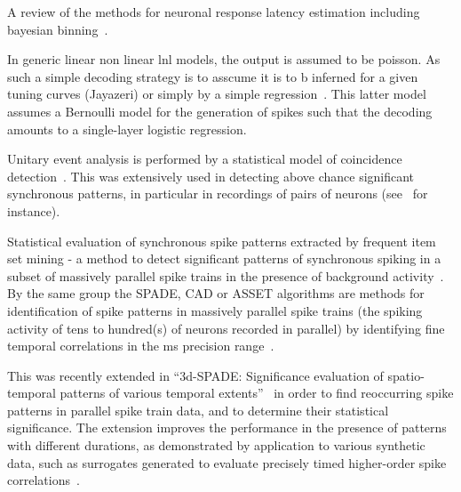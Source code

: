 \documentclass[brainsci, %
               review,submit,pdftex,moreauthors]{Definitions/mdpi}
\begin{document}
A review of the methods for neuronal response latency estimation including bayesian binning~\citep{levakova_review_2015}.



In generic linear non linear lnl models, the output is assumed to be poisson. As such a simple decoding strategy is to asscume it is to b inferned for a given tuning curves (Jayazeri) or simply by a simple regression~\citep{berens_fast_2012}. This latter model assumes a Bernoulli model for the generation of spikes such that the decoding amounts to a single-layer logistic regression.

Unitary event analysis is performed by a statistical model of coincidence detection~\citep{grun_unitary_2010}. This was extensively used in detecting above chance significant synchronous patterns, in particular in recordings of pairs of neurons (see~\citep{riehle_spike_1997} for instance).

Statistical evaluation of synchronous spike patterns extracted by frequent item set mining - a method to detect significant patterns of synchronous spiking in a subset of massively parallel spike trains in the presence of background activity~\citep{torre_statistical_2013}. By the same group the SPADE, CAD or ASSET algorithms are methods for identification of spike patterns in massively parallel spike trains (the spiking activity of tens to hundred(s) of neurons recorded in parallel) by identifying fine temporal correlations in the ms precision range~\citep{quaglio_methods_2018}.

This was recently extended in ``3d-SPADE: Significance evaluation of spatio-temporal patterns of various temporal extents''~\citep{stella_3d-spade_2019} in order to find reoccurring spike patterns in parallel spike train data, and to determine their statistical significance. The extension improves the performance in the presence of patterns with different durations, as demonstrated by application to various synthetic data, such as surrogates generated to evaluate precisely timed higher-order spike correlations~\citep{stella_comparing_2022}.
\end{document}

